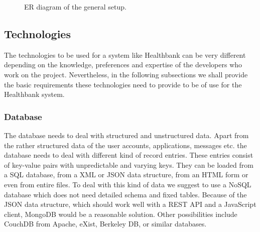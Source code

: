 \begin{figure}[ht]
%
\caption{ER diagram of the general setup.}
\label{fig:ERdiagram}
\end{figure} 


\subsection{Technologies} 

The technologies to be used for a system like Healthbank can be very different depending on the knowledge, preferences and expertise of the developers who work on the project. Nevertheless, in the following subsections we shall provide the basic requirements these technologies need to provide to be of use for the Healthbank system. 


\subsubsection{Database} 

The database needs to deal with structured and unstructured data. Apart from the rather structured data of the user accounts, applications, messages etc. the database needs to deal with different kind of record entries. These entries consist of key-value pairs with unpredictable and varying keys. They can be loaded from a SQL database, from a XML or JSON data structure, from an HTML form or even from entire files. To deal with this kind of data we suggest to use a NoSQL database which does not need detailed schema and fixed tables. Because of the JSON data structure, which should work well with a REST API and a JavaScript client, MongoDB would be a reasonable solution. Other possibilities include CouchDB from Apache, eXist, Berkeley DB, or similar databases. 
 
